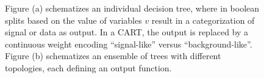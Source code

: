 \begin{figure}[h!]
\captionsetup[subfigure]{position=b}
\centering
{}
\caption{Figure (a) schematizes an individual decision tree, where in boolean splits based on the value of variables $v$ result in a categorization of signal or data as output. In a CART, the output is replaced by a continuous weight encoding ``signal-like'' versus ``background-like''. Figure (b) schematizes an ensemble of trees with different topologies, each defining an output function.}
\label{fig:}
\end{figure}

